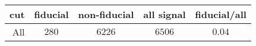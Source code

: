 \begin{tabular}{r|c|c|c|c}
cut&fiducial&non-fiducial&all signal&fiducial/all\\
\hline
All&$280$&$6226$&$6506$&$0.04$\\
\end{tabular}
